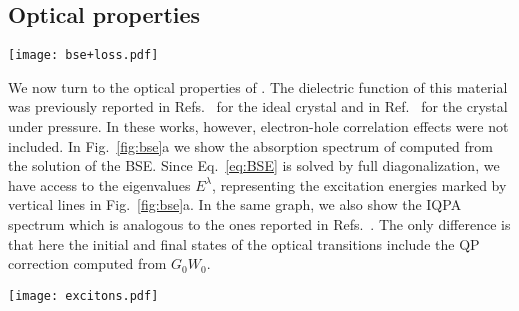 \documentclass[aps,pra,superscriptaddress,twocolumn]{revtex4}
\begin{document}
\subsection{Optical properties}
%
\begin{figure*}
\texttt{[image: bse+loss.pdf]}
\caption{a) Imaginary part of the macroscopic dielectric function of  including excitonic effects (BSE, red line). Vertical bars indicate position and relative intensity of the solutions of the BSE. The spectra include a Lorentzian broadening of 100 meV mimicking the excitation lifetime. The first four peaks are labeled as A, B, C, and D respectively. For comparison, the spectrum without excitons, computed in the so-called independent quasi-particle approximation (IQPA, grey area), is also shown. b) Real part of the macroscopic dielectric function (black) and loss function at $\mathbf{q} \rightarrow 0$ (red) computed from the BSE. A dashed line marks the zero in the scale of Re $\varepsilon_M$ as a guide for the eyes. A Lorentzian broadening of 200 meV is applied.}
\label{fig:bse}
\end{figure*} 
%
We now turn to the optical properties of .
The dielectric function of this material was previously reported in Refs.~\cite{kala+10jpcs,murt+16bms} for the ideal crystal and in Ref.~\cite{kala+10jpcs1} for the crystal under pressure.
In these works, however, electron-hole correlation effects were not included.
In Fig.~\ref{fig:bse}a we show the absorption spectrum of  computed from the solution of the BSE.
Since Eq.~\eqref{eq:BSE} is solved by full diagonalization, we have access to the eigenvalues $E^{\lambda}$, representing the excitation energies marked by vertical lines in Fig.~\ref{fig:bse}a.
In the same graph, we also show the IQPA spectrum which is analogous to the ones reported in Refs.~\cite{kala+10jpcs,murt+16bms}.
The only difference is that here the initial and final states of the optical transitions include the QP correction computed from $G_0W_0$.

%
\begin{figure*}
\center
\texttt{[image: excitons.pdf]}
\caption{Band-structure contribution (circles, see Eq.~\ref{eq:wh} and~\ref{eq:we}), of the excitons labeled in the optical absorption spectrum of Fig.~\ref{fig:bse}a). The QP correction is included as a rigid shift and the Fermi energy ($E_F$) is set to zero at valence-band top.}
\label{fig:excitons}
\end{figure*} 
%
\end{document}
